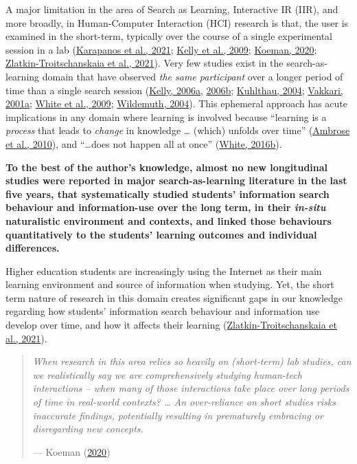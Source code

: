 \documentclass[letterpaper, nobind]{templates/ociamthesis}
\begin{document}
A major limitation in the area of Search as Learning, Interactive IR (IIR), and more broadly, in Human-Computer Interaction (HCI) research is
that, the user is examined in the short-term, typically over the course of a single experimental session in a lab
(\protect\hyperlink{ref-karapanos2021advances}{Karapanos et al., 2021}; \protect\hyperlink{ref-kelly2009evaluation}{Kelly et al., 2009}; \protect\hyperlink{ref-koeman2020hciux}{Koeman, 2020}; \protect\hyperlink{ref-zlatkin2021students}{Zlatkin-Troitschanskaia et al., 2021}).
Very few studies exist in the search-as-learning domain that have observed \emph{the same participant} over a longer period of time than a single search session (\protect\hyperlink{ref-kelly2006measuring-a}{Kelly, 2006a}, \protect\hyperlink{ref-kelly2006measuring-b}{2006b}; \protect\hyperlink{ref-kuhlthau2004seeking}{Kuhlthau, 2004}; \protect\hyperlink{ref-vakkari2001changes}{Vakkari, 2001a}; \protect\hyperlink{ref-white2009characterizing}{White et al., 2009}; \protect\hyperlink{ref-wildemuth2004effects}{Wildemuth, 2004}).
This ephemeral approach has acute implications in any domain where learning is involved because ``learning is a \emph{process} that leads to \emph{change} in knowledge \ldots{} (which) unfolds over time'' (\protect\hyperlink{ref-ambrose2010howa}{Ambrose et al., 2010}), and ``\ldots does not happen all at once'' (\protect\hyperlink{ref-white-2016-iwss-learning}{White, 2016b}).

\textbf{To the best of the author's knowledge, almost no new longitudinal studies were reported in major search-as-learning literature in the last five years, that systematically studied students' information search behaviour and information-use over the long term, in their \emph{in-situ} naturalistic environment and contexts, and linked those behaviours quantitatively to the students' learning outcomes and individual differences.}

Higher education students are increasingly using the Internet as their main learning environment and source of information when studying. Yet, the short term nature of research in this domain creates significant gaps in our knowledge regarding how students' information search behaviour and information use develop over time, and how it affects their learning (\protect\hyperlink{ref-zlatkin2021students}{Zlatkin-Troitschanskaia et al., 2021}).

\begin{quote}
\emph{When research in this area relies so heavily on (short-term) lab studies, can we realistically say we are comprehensively studying human-tech interactions -- when many of those interactions take place over long periods of time in real-world contexts? \ldots{} An over-reliance on short studies risks inaccurate findings, potentially resulting in prematurely embracing or disregarding new concepts.}

\hfill --- Koeman (\protect\hyperlink{ref-koeman2020hciux}{2020})
\end{quote}
\end{document}
